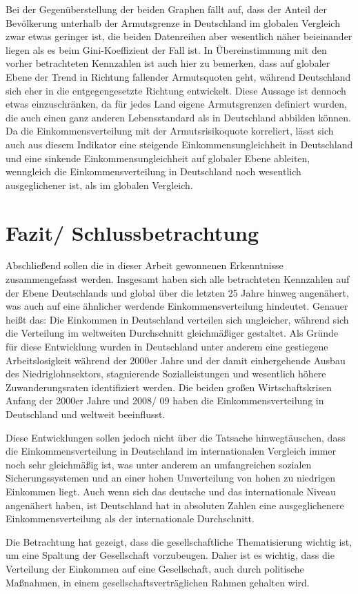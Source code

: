 Bei der Gegenüberstellung der beiden Graphen fällt auf, dass der Anteil der Bevölkerung unterhalb der Armutsgrenze in Deutschland im globalen Vergleich zwar etwas geringer ist, die beiden Datenreihen aber wesentlich näher beieinander liegen als es \zB beim Gini-Koeffizient der Fall ist. In Übereinstimmung mit den vorher betrachteten Kennzahlen ist auch hier zu bemerken, dass auf globaler Ebene der Trend in Richtung fallender Armutsquoten geht, während Deutschland  sich eher in die entgegengesetzte Richtung entwickelt. Diese Aussage ist dennoch etwas einzuschränken, da für jedes Land eigene Armutsgrenzen definiert wurden, die auch einen ganz anderen Lebensstandard als in Deutschland abbilden können. Da die Einkommensverteilung mit der Armutsrisikoquote korreliert, lässt sich auch aus diesem Indikator eine steigende Einkommensungleichheit in Deutschland und eine sinkende Einkommensungleichheit auf globaler Ebene ableiten, wenngleich die Einkommensverteilung in Deutschland noch wesentlich ausgeglichener ist, als im globalen Vergleich.

\chapter{Fazit/ Schlussbetrachtung}

Abschlie{\ss}end sollen die in dieser Arbeit gewonnenen Erkenntnisse zusammengefasst werden. Insgesamt haben sich alle betrachteten Kennzahlen auf der Ebene Deutschlands und global über die letzten 25 Jahre hinweg angenähert, was auch auf eine ähnlicher werdende Einkommensverteilung hindeutet. Genauer hei{\ss}t das: Die Einkommen in Deutschland verteilen sich ungleicher, während sich die Verteilung im weltweiten Durchschnitt gleichmä{\ss}iger gestaltet. Als Gründe für diese Entwicklung wurden in Deutschland unter anderem eine gestiegene Arbeitslosigkeit während der 2000er Jahre und der damit einhergehende Ausbau des Niedriglohnsektors, stagnierende Sozialleistungen und wesentlich höhere Zuwanderungsraten identifiziert werden. Die beiden gro{\ss}en Wirtschaftskrisen Anfang der 2000er Jahre und 2008/ 09 haben die Einkommensverteilung in Deutschland und weltweit beeinflusst.

Diese Entwicklungen sollen jedoch nicht über die Tatsache hinwegtäuschen, dass die Einkommensverteilung in Deutschland im internationalen Vergleich immer noch sehr gleichmä{\ss}ig ist, was unter anderem an umfangreichen sozialen Sicherungssystemen und an einer hohen Umverteilung von hohen zu niedrigen Einkommen liegt. Auch wenn sich das deutsche und das internationale Niveau angenähert haben, ist Deutschland hat in absoluten Zahlen eine ausgeglichenere Einkommensverteilung als der internationale Durchschnitt.

Die Betrachtung hat gezeigt, dass die gesellschaftliche Thematisierung wichtig ist, um eine Spaltung der Gesellschaft vorzubeugen. Daher ist es wichtig, dass die Verteilung der Einkommen auf eine Gesellschaft, auch durch politische Ma{\ss}nahmen, in einem gesellschaftsverträglichen Rahmen gehalten wird.